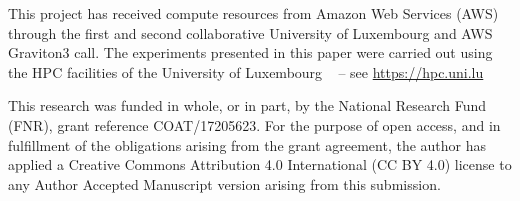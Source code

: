\begin{acknowledgement}
This project has received compute resources from Amazon Web Services (AWS)
through the first and second collaborative University of Luxembourg and
AWS Graviton3 call. The experiments presented in this paper were
carried out using the HPC facilities of the University of Luxembourg
~\cite{VCPKVO_HPCCT22} {\small -- see \url{https://hpc.uni.lu}}

This research was funded in whole, or in part, by the National Research
Fund (FNR), grant reference COAT/17205623. For the purpose of open
access, and in fulfillment of the obligations arising from the grant
agreement, the author has applied a Creative Commons Attribution 4.0
International (CC BY 4.0) license to any Author Accepted Manuscript
version arising from this submission.
\end{acknowledgement}



